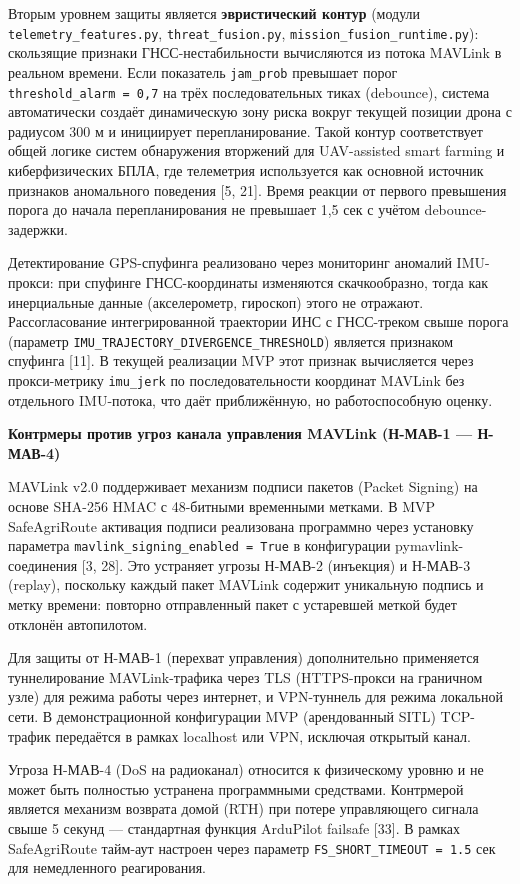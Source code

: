 Вторым уровнем защиты является \textbf{эвристический контур} (модули \texttt{telemetry\_features.py}, \texttt{threat\_fusion.py}, \texttt{mission\_fusion\_runtime.py}): скользящие признаки ГНСС-нестабильности вычисляются из потока MAVLink в реальном времени. Если показатель \texttt{jam\_prob} превышает порог \texttt{threshold\_alarm\ =\ 0,7} на трёх последовательных тиках (debounce), система автоматически создаёт динамическую зону риска вокруг текущей позиции дрона с радиусом 300 м и инициирует перепланирование. Такой контур соответствует общей логике систем обнаружения вторжений для UAV-assisted smart farming и киберфизических БПЛА, где телеметрия используется как основной источник признаков аномального поведения {[}5, 21{]}. Время реакции от первого превышения порога до начала перепланирования не превышает 1,5 сек с учётом debounce-задержки.

Детектирование GPS-спуфинга реализовано через мониторинг аномалий IMU-прокси: при спуфинге ГНСС-координаты изменяются скачкообразно, тогда как инерциальные данные (акселерометр, гироскоп) этого не отражают. Рассогласование интегрированной траектории ИНС с ГНСС-треком свыше порога (параметр \texttt{IMU\_TRAJECTORY\_DIVERGENCE\_THRESHOLD}) является признаком спуфинга {[}11{]}. В текущей реализации MVP этот признак вычисляется через прокси-метрику \texttt{imu\_jerk} по последовательности координат MAVLink без отдельного IMU-потока, что даёт приближённую, но работоспособную оценку.

\textbf{Контрмеры против угроз канала управления MAVLink (Н-МАВ-1 --- Н-МАВ-4)}

MAVLink v2.0 поддерживает механизм подписи пакетов (Packet Signing) на основе SHA-256 HMAC с 48-битными временными метками. В MVP SafeAgriRoute активация подписи реализована программно через установку параметра \texttt{mavlink\_signing\_enabled\ =\ True} в конфигурации pymavlink-соединения {[}3, 28{]}. Это устраняет угрозы Н-МАВ-2 (инъекция) и Н-МАВ-3 (replay), поскольку каждый пакет MAVLink содержит уникальную подпись и метку времени: повторно отправленный пакет с устаревшей меткой будет отклонён автопилотом.

Для защиты от Н-МАВ-1 (перехват управления) дополнительно применяется туннелирование MAVLink-трафика через TLS (HTTPS-прокси на граничном узле) для режима работы через интернет, и VPN-туннель для режима локальной сети. В демонстрационной конфигурации MVP (арендованный SITL) TCP-трафик передаётся в рамках localhost или VPN, исключая открытый канал.

Угроза Н-МАВ-4 (DoS на радиоканал) относится к физическому уровню и не может быть полностью устранена программными средствами. Контрмерой является механизм возврата домой (RTH) при потере управляющего сигнала свыше 5 секунд --- стандартная функция ArduPilot failsafe {[}33{]}. В рамках SafeAgriRoute тайм-аут настроен через параметр \texttt{FS\_SHORT\_TIMEOUT\ =\ 1.5} сек для немедленного реагирования.

